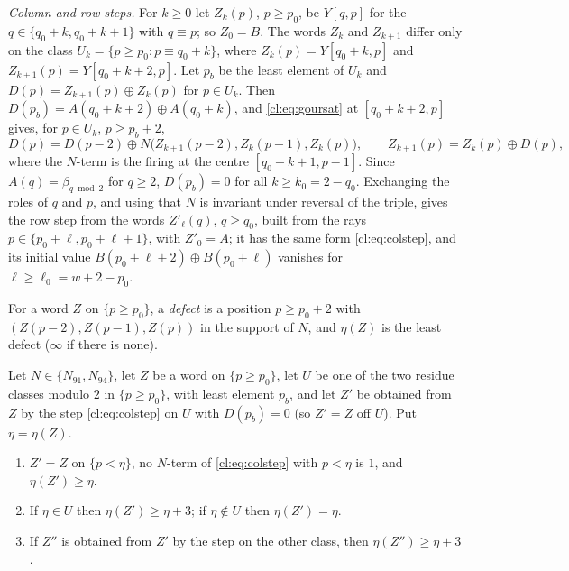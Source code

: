 \emph{Column and row steps.} For $k\ge0$ let $Z_k(p)$, $p\ge p_0$, be $Y[q,p]$ for the $q\in\{q_0+k,q_0+k+1\}$ with $q\equiv p$; so $Z_0=B$. The words $Z_k$ and $Z_{k+1}$ differ only on the class $U_k=\{p\ge p_0:p\equiv q_0+k\}$, where $Z_k(p)=Y[q_0+k,p]$ and $Z_{k+1}(p)=Y[q_0+k+2,p]$. Let $p_b$ be the least element of $U_k$ and $D(p)=Z_{k+1}(p)\oplus Z_k(p)$ for $p\in U_k$. Then $D(p_b)=A(q_0+k+2)\oplus A(q_0+k)$, and \eqref{cl:eq:goursat} at $[q_0+k+2,p]$ gives, for $p\in U_k$, $p\ge p_b+2$,
\begin{equation}\label{cl:eq:colstep}
D(p)=D(p-2)\oplus N\bigl(Z_{k+1}(p-2),Z_k(p-1),Z_k(p)\bigr),\qquad Z_{k+1}(p)=Z_k(p)\oplus D(p),
\end{equation}
where the $N$-term is the firing at the centre $[q_0+k+1,p-1]$. Since $A(q)=\beta_{q\bmod2}$ for $q\ge2$, $D(p_b)=0$ for all $k\ge k_0=2-q_0$. Exchanging the roles of $q$ and $p$, and using that $N$ is invariant under reversal of the triple, gives the row step from the words $Z'_\ell(q)$, $q\ge q_0$, built from the rays $p\in\{p_0+\ell,p_0+\ell+1\}$, with $Z'_0=A$; it has the same form \eqref{cl:eq:colstep}, and its initial value $B(p_0+\ell+2)\oplus B(p_0+\ell)$ vanishes for $\ell\ge\ell_0=w+2-p_0$.

For a word $Z$ on $\{p\ge p_0\}$, a \emph{defect} is a position $p\ge p_0+2$ with $(Z(p-2),Z(p-1),Z(p))$ in the support of $N$, and $\eta(Z)$ is the least defect ($\infty$ if there is none).

\begin{lemma}\label{cl:lem:climb}
Let $N\in\{N_{91},N_{94}\}$, let $Z$ be a word on $\{p\ge p_0\}$, let $U$ be one of the two residue classes modulo $2$ in $\{p\ge p_0\}$, with least element $p_b$, and let $Z'$ be obtained from $Z$ by the step \eqref{cl:eq:colstep} on $U$ with $D(p_b)=0$ (so $Z'=Z$ off $U$). Put $\eta=\eta(Z)$.
\begin{enumerate}
\item[(i)] $Z'=Z$ on $\{p<\eta\}$, no $N$-term of \eqref{cl:eq:colstep} with $p<\eta$ is $1$, and $\eta(Z')\ge\eta$.
\item[(ii)] If $\eta\in U$ then $\eta(Z')\ge\eta+3$; if $\eta\notin U$ then $\eta(Z')=\eta$.
\item[(iii)] If $Z''$ is obtained from $Z'$ by the step on the other class, then $\eta(Z'')\ge\eta+3$.
\end{enumerate}
\end{lemma}

